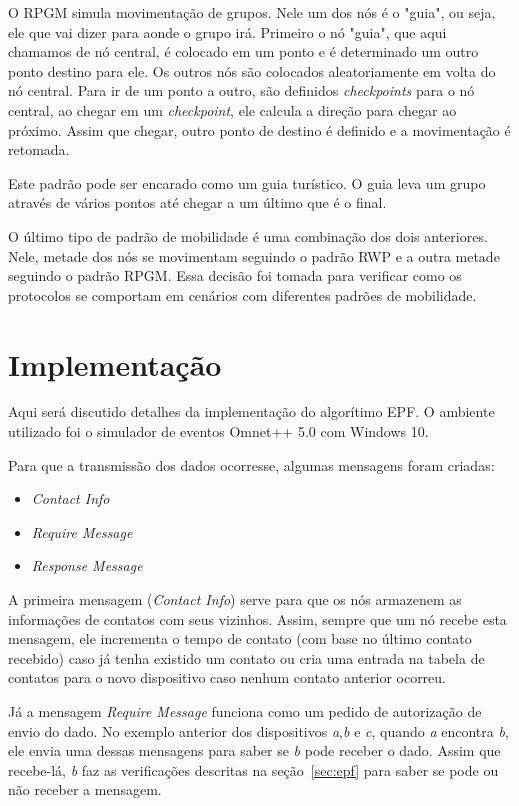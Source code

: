 \documentclass[11pt,a4paper,titlepage]{article}
\begin{document}
O RPGM simula movimentação de grupos.
Nele um dos nós é o "guia", ou seja, ele que vai dizer para aonde o grupo irá.
Primeiro o nó "guia", que aqui chamamos de nó central, é colocado em um ponto e é determinado um outro ponto destino para ele.
Os outros nós são colocados aleatoriamente em volta do nó central.
Para ir de um ponto a outro, são definidos \textit{checkpoints} para o nó central, ao chegar em um \textit{checkpoint}, ele calcula a direção para chegar ao próximo.
Assim que chegar, outro ponto de destino é definido e a movimentação é retomada.

Este padrão pode ser encarado como um guia turístico.
O guia leva um grupo através de vários pontos até chegar a um último que é o final.

O último tipo de padrão de mobilidade é uma combinação dos dois anteriores.
Nele, metade dos nós se movimentam seguindo o padrão RWP e a outra metade seguindo o padrão RPGM.
Essa decisão foi tomada para verificar como os protocolos se comportam em cenários com diferentes padrões de mobilidade.

\section{Implementação}\label{sec:imp}

Aqui será discutido detalhes da implementação do algorítimo EPF.
O ambiente utilizado foi o simulador de eventos Omnet++ 5.0 com Windows 10.

Para que a transmissão dos dados ocorresse, algumas mensagens foram criadas:

\begin{itemize}
\item \textit{Contact Info}
\item \textit{Require Message}
\item \textit{Response Message}
\end{itemize}

A primeira mensagem (\textit{Contact Info}) serve para que os nós armazenem as informações de contatos com seus vizinhos.
Assim, sempre que um nó recebe esta mensagem, ele incrementa o tempo de contato (com base no último contato recebido) caso já tenha existido um contato ou cria uma entrada na tabela de contatos para o novo dispositivo caso nenhum contato anterior ocorreu.

Já a mensagem \textit{Require Message} funciona como um pedido de autorização de envio do dado.
No exemplo anterior dos dispositivos \textit{a},\textit{b} e \textit{c}, quando \textit{a} encontra \textit{b}, ele envia uma dessas mensagens para saber se \textit{b} pode receber o dado.
Assim que recebe-lá, \textit{b} faz as verificações descritas na seção~\ref{sec:epf} para saber se pode ou não receber a mensagem.
\end{document}
